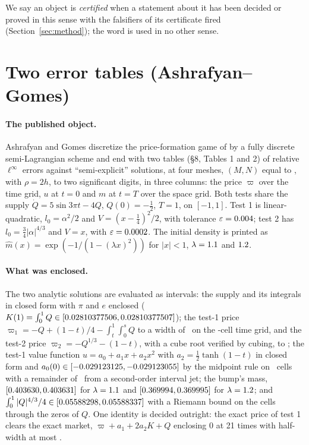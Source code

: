 \documentclass[11pt]{article}
\begin{document}
We say an object is \emph{certified} when a statement about it has been decided or proved in this sense with the falsifiers of its certificate fired (Section~\ref{sec:method}); the word is used in no other sense.

\section{Two error tables (Ashrafyan--Gomes)}\label{sec:ag}

\paragraph{The published object.} Ashrafyan and Gomes \cite{AG25} discretize the price-formation game of \cite{GS21} by a fully discrete semi-Lagrangian scheme and end with two tables (\S8, Tables 1 and 2) of relative $\ell^\infty$ errors against ``semi-explicit'' solutions, at four meshes, $(M, N)$ equal to \AGMeshes, with $\rho = 2h$, to two significant digits, in three columns: the price $\varpi$ over the time grid, $u$ at $t = 0$ and $m$ at $t = T$ over the space grid. Both tests share the supply $\dot Q = 5\sin 3\pi t - 4Q$, $Q(0) = -\tfrac12$, $T = 1$, on $[-1, 1]$. Test 1 is linear-quadratic, $l_0 = \alpha^2/2$ and $V = (x - \tfrac14)^2/2$, with tolerance $\varepsilon = 0.004$; test 2 has $l_0 = \tfrac34|\alpha|^{4/3}$ and $V = x$, with $\varepsilon = 0.0002$. The initial density is printed as $\hat m(x) = \exp(-1/(1 - (\lambda x)^2))$ for $|x| < 1$, $\lambda = 1.1$ and $1.2$.

\paragraph{What was enclosed.} The two analytic solutions are evaluated as intervals: the supply and its integrals in closed form with $\pi$ and $e$ enclosed ($K(1) = \int_0^1 Q \in [0.02810377506, 0.02810377507]$); the test-1 price $\varpi_1 = -Q + (1 - t)/4 - \int_t^1\!\int_0^s Q$ to a width of \AGPriceWidthOne\ on the \AGGridN-cell time grid, and the test-2 price $\varpi_2 = -Q^{1/3} - (1 - t)$, with a cube root verified by cubing, to \AGPriceWidthTwo; the test-1 value function $u = a_0 + a_1 x + a_2 x^2$ with $a_2 = \tfrac12\tanh(1 - t)$ in closed form and $a_0(0) \in [-0.029123125, -0.029123055]$ by the midpoint rule on \AGaZeroK\ cells with a remainder of \AGaZeroRem\ from a second-order interval jet; the bump's mass, $[0.403630, 0.403631]$ for $\lambda = 1.1$ and $[0.369994, 0.369995]$ for $\lambda = 1.2$; and $\int_0^1|Q|^{4/3}/4 \in [0.05588298, 0.05588337]$ with a Riemann bound on the cells through the zeros of $Q$. One identity is decided outright: the exact price of test 1 clears the exact market, $\varpi + a_1 + 2a_2 K + Q$ enclosing $0$ at 21 times with half-width at most \AGClearingHalf.
\end{document}

